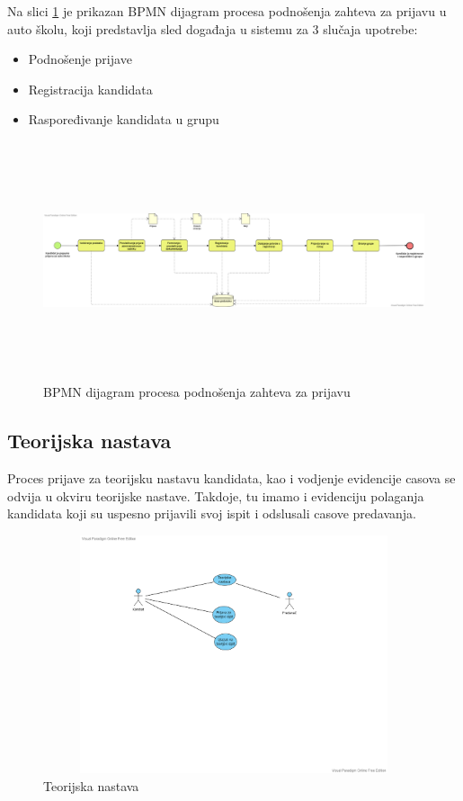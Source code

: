 Na slici \ref{fig:bpmn_podnosenje_zahteva} je prikazan BPMN dijagram procesa podnošenja zahteva za prijavu u auto školu,
koji predstavlja sled događaja u sistemu za 3 slučaja upotrebe:
\begin{itemize}
    \item Podnošenje prijave
    \item Registracija kandidata
    \item Raspoređivanje kandidata u grupu
\end{itemize}

\begin{figure}[H]
    \begin{center}
        \includegraphics[width=155mm, height = 70mm]{Diagrams/bpmn_podnosenje_zahteva.png}
    \end{center}
    \caption {BPMN dijagram procesa podnošenja zahteva za prijavu}
    \label{fig:bpmn_podnosenje_zahteva}

\end{figure}


\subsection {Teorijska nastava}
Proces prijave za teorijsku nastavu kandidata, kao i vodjenje evidencije casova se odvija u okviru teorijske nastave. Takdoje, tu imamo i evidenciju polaganja kandidata koji su uspesno prijavili svoj ispit i odslusali casove predavanja.

\begin{figure}[H]
  \begin{center}
      \includegraphics[width=140mm, height=70mm]{Diagrams/diagram teorijska nastava.png}
  \end{center}
  \caption {Teorijska nastava}
  \label{theory}

\end{figure}

